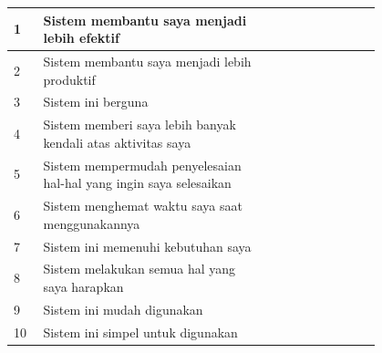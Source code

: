 \begin{longtable}{|p{0.05\linewidth}|p{0.5\linewidth}|p{0.05\linewidth}|p{0.05\linewidth}|p{0.05\linewidth}|p{0.05\linewidth}|p{0.05\linewidth}|}
      1           & Sistem membantu saya menjadi lebih efektif                                                            &                                         &             &            &            &             \\
      \hline
      2           & Sistem membantu saya menjadi lebih produktif                                                          &                                         &             &            &            &             \\
      \hline
      3           & Sistem ini berguna                                                                                    &                                         &             &            &            &             \\
      \hline
      4           & Sistem memberi saya lebih banyak kendali atas aktivitas saya                                          &                                         &             &            &            &             \\
      \hline
      5           & Sistem mempermudah penyelesaian hal-hal yang ingin saya selesaikan                                    &                                         &             &            &            &             \\
      \hline
      6           & Sistem menghemat waktu saya saat menggunakannya                                                       &                                         &             &            &            &             \\
      \hline
      7           & Sistem ini memenuhi kebutuhan saya                                                                    &                                         &             &            &            &             \\
      \hline
      8           & Sistem melakukan semua hal yang saya harapkan                                                         &                                         &             &            &            &             \\
      \hline
      9           & Sistem ini mudah digunakan                                                                            &                                         &             &            &            &             \\
      \hline
      10          & Sistem ini simpel untuk digunakan                                                                     &                                         &             &            &            &             \\

\end{longtable}
